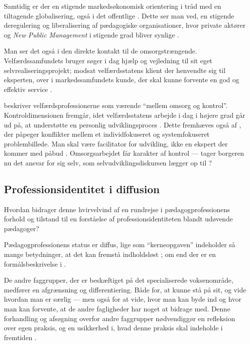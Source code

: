 Samtidig er der en stigende markedsøkonomisk orientering i tråd med en tiltagende globalisering, også i det offentlige \autocite[s. 161]{kofodOrganisationOgLedelse2016}.
Dette ser man ved, en stigende deregulering og liberalisering af pædagogiske organisationer, hvor private aktører og \textit{New Public Management} i stigende grad bliver synlige \autocite[s. 161]{kofodOrganisationOgLedelse2016}.

Man ser det også i den direkte kontakt til de omsorgstrængende. Velfærdssamfundets bruger søger i dag hjælp og vejledning til sit eget selvrealiseringsprojekt; modsat velfærdsstatens klient der henvendte sig til eksperten, over i markedssamfundets kunde, der skal kunne forvente en god og effektiv service \autocite[s. 41f ]{hansbolKonstruktionAfProfessionel2008}.

\citeauthor{frederiksenVelfaerdsprofessionerMellemOmsorg2017} beskriver velfærdsprofessionerne som værende “mellem omsorg og kontrol”. 
Kontroldimensionen fremgår, idet velfærdsstatens arbejde i dag i højere grad går ud på, at understøtte en personlig udviklingsproces \autocite[s. 461]{frederiksenVelfaerdsprofessionerMellemOmsorg2017}.
Dette fremhæves også af \citeauthor{mik-meyerIndledningSkabeProfessionel2012}, der påpeger konflikter mellem et individfokuseret og systemfokuseret problembillede.
Man skal være facilitator for udvikling, ikke en ekspert der kommer med påbud \autocite[s. 74ff]{mik-meyerIndledningSkabeProfessionel2012}.
Omsorgsarbejdet får karakter af kontrol --- tager borgeren nu det ansvar for sig selv, som selvudviklingsdiskursen lægger op til \autocite[s. 461]{frederiksenVelfaerdsprofessionerMellemOmsorg2017}?


\subsection{Professionsidentitet i diffusion}
Hvordan bidrager denne hvirvelvind af en rundrejse i pædagogprofessionens forhold og tilstand til en forståelse af professionsidentiteten blandt udøvende pædagoger?

Pædagogprofessionens status er diffus, lige som “kerneopgaven” indeholder så mange betydninger, at det kan fremstå indholdsløst ; om end der er en formålsbeskrivelse i .

De andre faggrupper, der er beskæftiget på det specialiserede voksenområde, medfører en afgrænsning og differentiering. Både for, at kunne stå på sit, og vide hvordan man er særlig --- men også for at vide, hvor man kan byde ind og hvor man kan forvente, at de andre fagligheder har noget at bidrage med.
Denne forhandling og afsøgning overfor andre faggrupper nødvendiggør en refleksion over egen praksis, og en usikkerhed i, hvad denne praksis skal indeholde i fremtiden \autocite[s 312f]{porsKerneloseKerneopgaverSkolen2015}.

